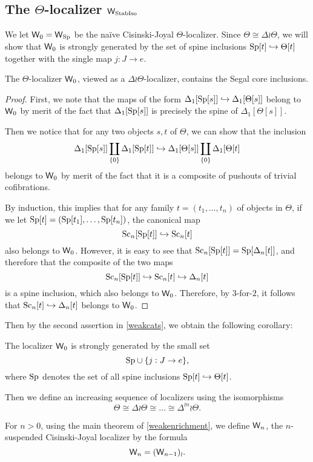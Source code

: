 \subsection{The $\Theta$-localizer $\mathsf{W}_{\operatorname{StabIso}}$}
We let \(\mathsf{W}_0=\mathsf{W}_{\operatorname{Sp}}\) be the na\"ive Cisinski-Joyal \(\Theta\)-localizer.  Since \(\Theta \cong \Delta\wr\Theta\), we will show that \(\mathsf{W}_0\) is strongly generated by the set of spine inclusions \({\operatorname{Sp}}[t]\hookrightarrow \Theta[t]\) together with the single map \(j:J\to e\).  
\begin{lemma}\label{spinescontaincores} 
The \(\Theta\)-localizer \(\mathsf{W}_0\), viewed as a \(\Delta\wr \Theta\)-localizer, contains the Segal core inclusions. 
\end{lemma} 
\begin{proof}
First, we note that the maps of the form \(\Delta_1[{\operatorname{Sp}}[s]]\hookrightarrow \Delta_1[\Theta[s]]\) belong to \(\mathsf{W}_0\) by merit of the fact that \(\Delta_1[{\operatorname{Sp}}[s]]\) is precisely the spine of \(\Delta_1[\Theta[s]]\).

Then we notice that for any two objects \(s,t\) of \(\Theta\), we can show that the inclusion \[\Delta_1[{\operatorname{Sp}}[s]]\coprod_{\{0\}} \Delta_1[{\operatorname{Sp}}[t]]\hookrightarrow \Delta_1[\Theta[s]]\coprod_{\{0\}} \Delta_1[\Theta[t]\] belongs to \(\mathsf{W}_0\) by merit of the fact that it is a composite of pushouts of trivial cofibrations.  

By induction, this implies that for any family \(t=(t_1,\dots,t_n)\) of objects in \(\Theta\), if we let \({\operatorname{Sp}}[t]=({\operatorname{Sp}}[t_1],\dots,{\operatorname{Sp}}[t_n])\), the canonical map \[{\operatorname{Sc}}_n[{\operatorname{Sp}}[t]]\hookrightarrow {\operatorname{Sc}}_n[t]\] also belongs to \(\mathsf{W}_0\).  However, it is easy to see that \({\operatorname{Sc}}_n[{\operatorname{Sp}}[t]]={\operatorname{Sp}}[\Delta_n[t]]\), and therefore that the composite of the two maps  \[{\operatorname{Sc}}_n[{\operatorname{Sp}}[t]]\hookrightarrow {\operatorname{Sc}}_n[t]\hookrightarrow \Delta_n[t]\] is a spine inclusion, which also belongs to \(\mathsf{W}_0\).  Therefore, by \(3\)-for-\(2\), it follows that \({\operatorname{Sc}}_n[t]\hookrightarrow \Delta_n[t]\) belongs to \(\mathsf{W}_0\).  
\end{proof}
Then by the second assertion in \eqref{weakcats}, we obtain the following corollary:
\begin{cor}The localizer \(\mathsf{W}_0\) is strongly generated by the small set \[{\operatorname{Sp}} \cup \{j:J\to e\},\] where \({\operatorname{Sp}}\) denotes the set of all spine inclusions \({\operatorname{Sp}}[t]\hookrightarrow \Theta[t]\).  
\end{cor} 
Then we define an increasing sequence of localizers using the isomorphisms \[\Theta\cong \Delta\wr \Theta \cong \dots \cong \Delta^{\wr n}\wr \Theta.\]
\begin{defn} For \(n>0\), using the main theorem of \eqref{weakenrichment}, we define \(\mathsf{W}_n\),  the \(n\)-suspended Cisinski-Joyal localizer by the formula \[\mathsf{W}_n=(\mathsf{W}_{n-1})_\wr.\]
\end{defn}
